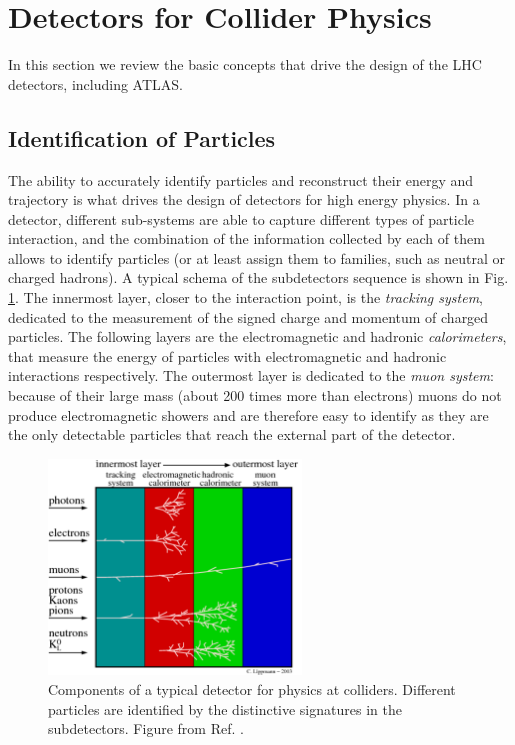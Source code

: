 \section{Detectors for Collider Physics}
\label{sec:detectors}

In this section we review the basic concepts that drive the design of the LHC detectors, including ATLAS.

\subsection{Identification of Particles}
\label{sec:detectors:identification}



The ability to accurately identify particles and reconstruct their energy and trajectory is what drives the design of detectors for high energy physics. In a detector, different sub-systems are able to capture different types of particle interaction, and the combination of the information collected by each of them allows to identify particles (or at least assign them to families, such as neutral or charged hadrons). A typical schema of the subdetectors sequence is shown in Fig. \ref{fig:detector:interaction}. The innermost layer, closer to the interaction point, is the \textit{tracking system}, dedicated to the measurement of the signed charge and momentum of charged particles. The following layers are the electromagnetic and hadronic \textit{calorimeters}, that measure the energy of particles with electromagnetic and hadronic interactions respectively. The outermost layer is dedicated to the \textit{muon system}: because of their large mass (about 200 times more than electrons) muons do not produce electromagnetic showers and are therefore easy to identify as they are the only detectable particles that reach the external part of the detector.

\begin{figure}[ht]
\centering
\includegraphics[width=0.6\textwidth]{figures/detector/particles_in_detector}
\caption{Components of a typical detector for physics at colliders. Different particles are identified by the distinctive signatures in the subdetectors. Figure from Ref. \cite{Lippmann:2011bb}.}
\label{fig:detector:interaction}
\end{figure}


